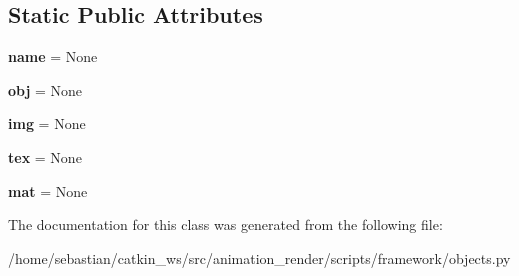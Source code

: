 \subsection*{Static Public Attributes}
\begin{DoxyCompactItemize}
\item 
{\bfseries name} = None\hypertarget{classframework_1_1objects_1_1BlenderObject_aa3cf78717bf12612ae9019de061be874}{}\label{classframework_1_1objects_1_1BlenderObject_aa3cf78717bf12612ae9019de061be874}

\item 
{\bfseries obj} = None\hypertarget{classframework_1_1objects_1_1BlenderObject_ac6552fd16b067cd39a3bf80f9b20f775}{}\label{classframework_1_1objects_1_1BlenderObject_ac6552fd16b067cd39a3bf80f9b20f775}

\item 
{\bfseries img} = None\hypertarget{classframework_1_1objects_1_1BlenderObject_a735951a1c2c48406db49a8597fb43f52}{}\label{classframework_1_1objects_1_1BlenderObject_a735951a1c2c48406db49a8597fb43f52}

\item 
{\bfseries tex} = None\hypertarget{classframework_1_1objects_1_1BlenderObject_aba326a9581bf8d012dfff6d8b7851cf6}{}\label{classframework_1_1objects_1_1BlenderObject_aba326a9581bf8d012dfff6d8b7851cf6}

\item 
{\bfseries mat} = None\hypertarget{classframework_1_1objects_1_1BlenderObject_a3af924160e7ac996b2e22cad7aabb340}{}\label{classframework_1_1objects_1_1BlenderObject_a3af924160e7ac996b2e22cad7aabb340}

\end{DoxyCompactItemize}


The documentation for this class was generated from the following file\+:\begin{DoxyCompactItemize}
\item 
/home/sebastian/catkin\+\_\+ws/src/animation\+\_\+render/scripts/framework/objects.\+py\end{DoxyCompactItemize}
